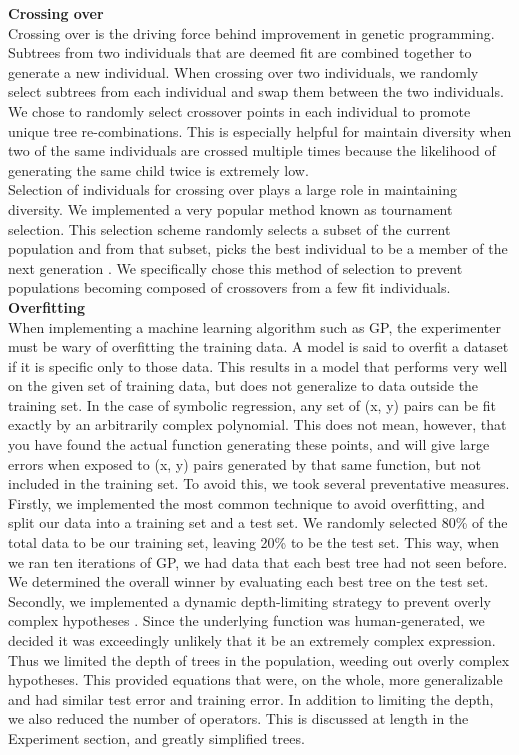 \textbf{Crossing over}\\
	Crossing over is the driving force behind improvement in genetic programming. Subtrees from two individuals that are deemed fit are combined together to generate a new individual. When crossing over two individuals, we randomly select subtrees from each individual and swap them between the two individuals.  We chose to randomly select crossover points in each individual to promote unique tree re-combinations. This is especially helpful for maintain diversity when two of the same individuals are crossed multiple times because the likelihood of generating the same child twice is extremely low.\\
	Selection of individuals for crossing over plays a large role in maintaining diversity. We implemented a very popular method known as tournament selection. This selection scheme randomly selects a subset of the current population and from that subset, picks the best individual to be a member of the next generation \cite{Gupta_anoverview}. We specifically chose this method of selection to prevent populations becoming composed of crossovers from a few fit individuals.\\

\textbf{Overfitting}\\
When implementing a machine learning algorithm such as GP, the experimenter must be wary of overfitting the training data. A model is said to overfit a dataset if it is specific only to those data. This results in a model that performs very well on the given set of training data, but does not generalize to data outside the training set. In the case of symbolic regression, any set of (x, y) pairs can be fit exactly by an arbitrarily complex polynomial. This does not mean, however, that you have found the actual function generating these points, and will give large errors when exposed to (x, y) pairs generated by that same function, but not included in the training set. To avoid this, we took several preventative measures. \\
Firstly, we implemented the most common technique to avoid overfitting, and split our data into a training set and a test set. We randomly selected 80\% of the total data to be our training set, leaving 20\% to be the test set. This way, when we ran ten iterations of GP, we had data that each best tree had not seen before. We determined the overall winner by evaluating each best tree on the test set.\\
Secondly, we implemented a dynamic depth-limiting strategy to prevent
overly complex hypotheses \cite{Overfitting}.  Since the underlying function was human-generated, we decided it was exceedingly unlikely that it be an extremely complex expression. Thus we limited the depth of trees in the population, weeding out overly complex hypotheses. This provided equations that were, on the whole, more generalizable and had similar test error and training error. In addition to limiting the depth, we also reduced the number of operators. This is discussed at length in the Experiment section, and greatly simplified trees.\\


